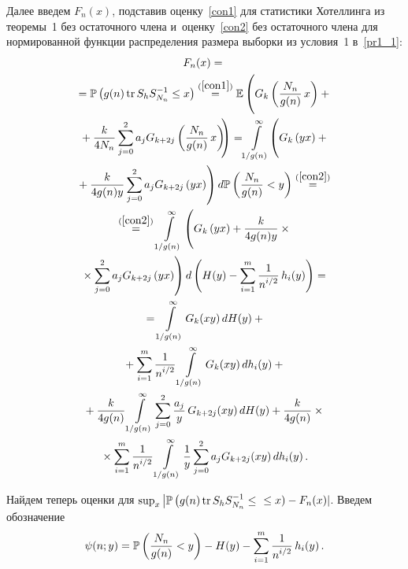 \begin{multicols}{2}
Далее введем $F_n(x)$, подставив оценку~\eqref{con1} для статистики Хотеллинга 
из теоремы~1 без остаточного члена и~оценку~\eqref{con2} без 
остаточного члена для нормированной функции распределения размера выборки из 
условия~1 в~\eqref{pr1_1}:
\begin{multline}
\label{pr1_2}
F_n(x)={}\\
{}=\mathbb{P} \left( g(n) \,\mathrm{tr}\, S_h S^{-1}_{N_n} \leq x \right)
\stackrel{(\ref{con1})}{=}
 \mathbb{E}\left( 
 \vphantom{\sum\limits_{j=0}^{2}}
 G_k\left(\fr{N_n}{g(n)}\,x \right) + {}\right.\\
\left. {}+
\fr{k}{4N_n}\sum\limits_{j=0}^{2}a_j G_{k+2j}\left(\fr{N_n}{g(n)}\,x \right)\! \!\right) 
= \! \int\limits_{1/g(n)}^{\infty}\!\left( 
\vphantom{\sum\limits_{j=0}^{2}}
G_k\left(yx \right) + {}\right.\\
\left.{}+
\fr{k}{4g(n)y}\sum\limits_{j=0}^{2}a_j G_{k+2j}\left(yx \right) \right) 
d\mathbb{P}\left( \fr{N_n}{g(n)} < y \right)  \stackrel{(\ref{con2})}{=}{} \\
{}\stackrel{(\ref{con2})}{=} \int\limits_{1/g(n)}^{\infty}\left(
\vphantom{\sum\limits_{j=0}^{2}} 
G_k\left(yx \right) + 
\fr{k}{4g(n)y}\times{}\right.\\
\left.{}\times \sum\limits_{j=0}^{2}a_j G_{k+2j}\left(yx \right) 
\right) d\left( H(y) - \sum\limits_{i=1}^{m}\fr{1}{n^{i/2}}\, h_i(y) \right) 
={}\\
{}=\int\limits^{\infty}_{1/g(n)} G_k(xy)\,dH(y) + {}\\
{}+
\sum\limits_{i=1}^{m}\fr{1}{n^{i/2}}\int\limits^{\infty}_{1/g(n)} G_k(xy)\,dh_i(y) + {}
 \\
{}+ \fr{k}{4 g(n)} \int\limits_{1/g(n)}^\infty \sum\limits_{j=0}^{2} 
\fr{a_j}{y}\,G_{k+2j}(xy)\, dH(y)+\fr{k}{4 g(n)}\times{}\\
{}\times
 \sum\limits_{i=1}^{m}\fr{1}{n^{i/2}} \int\limits_{1/g(n)}^\infty 
\fr{1}{y} \sum\limits_{j=0}^{2}a_j G_{k+2j}(xy)\,dh_i(y)\,.
 \end{multline}

\noindent
Найдем теперь оценки для $\sup\nolimits_{x} \left| \mathbb{P}\left( g(n) \,\textrm{tr} \,S_h S^{-1}_{N_n}
\hm \leq\right.\right.$\linebreak $\left.\left.\leq x\right) \hm - F_{n}(x) \right|$. Введем обозначение
\begin{equation*}
\psi (n;y) =  \mathbb{P}\left( \displaystyle\frac{\displaystyle N_n\mathstrut}{\displaystyle g(n)\mathstrut} < y \right) - H(y) - 
\sum\limits_{i=1}^{m}\displaystyle\frac{\displaystyle 1\mathstrut}{\displaystyle n^{i/2}\mathstrut}\, h_i(y)\,.
\end{equation*}


\end{multicols}
